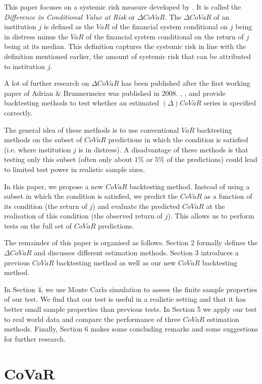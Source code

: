 \documentclass[12pt]{article}
\begin{document}
This paper focuses on a systemic risk measure developed by \citet{adrian}. It is called the \textit{Difference in Conditional Value at Risk} or $\Delta CoVaR$. The $\Delta CoVaR$ of an institution $j$ is defined as the $VaR$ of the financial system conditional on $j$ being in distress minus the $VaR$ of the financial system conditional on the return of $j$ being at its median. This definition captures the systemic risk in line with the definition mentioned earlier, the amount of systemic risk that can be attributed to institution $j$.

A lot of further research on $\Delta CoVaR$ has been published after the first working paper of Adrian \& Brunnermeier was published in 2008. \citet{girardi}, \citet{copulas}, and \citet{mesbacktest} provide backtesting methods to test whether an estimated $(\Delta) CoVaR$ series is specified correctly.

The general idea of these methods is to use conventional $VaR$ backtesting methods on the subset of $CoVaR$ predictions in which the condition is satisfied (i.e.  where institution $j$ is in distress). A disadvantage of these methods is that testing only this subset (often only about $1\%$ or $5\%$ of the predictions) could lead to limited test power in realistic sample sizes.

In this paper, we propose a new $CoVaR$ backtesting method. Instead of using a subset in which the condition is satisfied, we predict the $CoVaR$ as a function of its condition (the return of $j$) and evaluate the predicted $CoVaR$ at the realisation of this condition (the observed return of $j$). This allows us to perform tests on the full set of $CoVaR$ predictions.

The remainder of this paper is organised as follows. Section 2 formally defines the $\Delta CoVaR$ and discusses different estimation methods. Section 3 introduces a previous $CoVaR$ backtesting method as well as our new $CoVaR$ backtesting method.

In Section 4, we use Monte Carlo simulation to assess the finite sample properties of our test. We find that our test is useful in a realistic setting and that it has better small sample properties than previous tests. In Section 5 we apply our test to real world data and compare the performance of three $CoVaR$ estimation methods. Finally, Section 6 makes some concluding remarks and some suggestions for further research.



\section{CoVaR}
\end{document}
